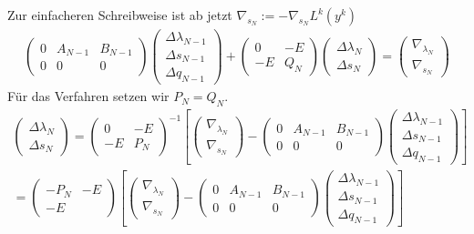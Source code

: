 \documentclass[12pt,a4paper]{article}
\begin{document}
  Zur einfacheren Schreibweise ist ab jetzt $ \nabla_{s_{N}} := -\nabla_{s_{N}} L^{k}(y^{k}) $
  \begin{align*}
  \begin{pmatrix}
   0  & A_{N-1} & B_{N-1} \\
   0  & 0  &  0 
  \end{pmatrix}
  \begin{pmatrix}
  \Delta \lambda_{N-1} \\
  \Delta s_{N-1} \\
  \Delta q_{N-1} 
  \end{pmatrix} 
  +
  \begin{pmatrix}
   0 & -E \\
   -E  &  Q_N 
  \end{pmatrix}
  \begin{pmatrix}
  \Delta \lambda_{N} \\
  \Delta s_{N} 
  \end{pmatrix} 
  = 
  \begin{pmatrix}
  \nabla_{\lambda_{N}} \\ 
  \nabla_{s_{N}} 
  \end{pmatrix}
  \end{align*}
  Für das Verfahren setzen wir $ P_N = Q_N $.
  \begin{align*}
  \begin{pmatrix}
  \Delta \lambda_{N} \\
  \Delta s_{N} 
  \end{pmatrix}
  =
  \begin{pmatrix}
   0 & -E \\
   -E  &  P_N 
  \end{pmatrix}^{-1}
  \left[ 
  \begin{pmatrix}
  \nabla_{\lambda_{N}} \\ 
  \nabla_{s_{N}} 
  \end{pmatrix}
  -
  \begin{pmatrix}
   0  & A_{N-1} & B_{N-1} \\
   0  & 0  &  0 
  \end{pmatrix}
  \begin{pmatrix}
  \Delta \lambda_{N-1} \\
  \Delta s_{N-1} \\
  \Delta q_{N-1} 
  \end{pmatrix} \right] \\
  =
  \begin{pmatrix}
   -P_N & -E \\
   -E  &   
  \end{pmatrix}
  \left[ 
  \begin{pmatrix}
  \nabla_{\lambda_{N}} \\ 
  \nabla_{s_{N}} 
  \end{pmatrix}
  -
  \begin{pmatrix}
   0  & A_{N-1} & B_{N-1} \\
   0  & 0  &  0 
  \end{pmatrix}
  \begin{pmatrix}
  \Delta \lambda_{N-1} \\
  \Delta s_{N-1} \\
  \Delta q_{N-1} 
  \end{pmatrix} \right] 
  \end{align*}
\end{document}
